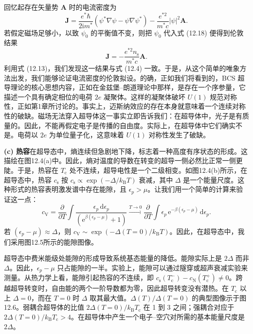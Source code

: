 回忆起存在矢量势 $\mathbf{A}$ 时的电流密度为
\begin{equation*}
\mathbf{J}=\frac{e^{*}\hbar}{2\mathrm{i}m^{*}}\left(\psi^{*}\nabla\psi-\psi\nabla\psi^{*}\right)-\frac{e^{*2}}{m^{*}c}|\psi|^{2}\mathbf{A}.\tag{12.18}
\end{equation*}
若假定磁场足够小，以致 $\psi_{0}$ 的平衡值不变，则把 $\psi_{0}$ 代入式 (12.18) 便得到伦敦结果
\begin{equation*}
\mathbf{J}=-\frac{e^{*2}n_{\mathrm{s}}}{m^{*}c}\mathbf{A}.\tag{12.19}
\end{equation*}
利用式 (12.13)，我们发现这一结果与式 (12.4) 一致。于是，从这个简单的唯象方法出发，我们能够论证电流密度的伦敦拟设。的确，正如我们将看到的，BCS 超导理论的核心思想内容，正如在金兹堡–朗道理论中那样，是存在一个序参量，它描述一个具有确定相位的电荷 $2e$ 凝聚体。这样的凝聚体破坏 $U(1)$ 规范对称性，正如第1章所讨论的。事实上，迈斯纳效应的存在本身就意味着一个连续对称性的破缺。磁场无法穿入超导体这一事实立即告诉我们：在超导体中，光子是有质量的。因此，不能再假定电子是传播的自由度。实际上，在超导体中它们确实不是。电荷以 $2e$ 为单位量子化，这意味着 $U(1)$ 对称性发生了破缺。

\textbf{(c) 热容}\quad 在超导态中，熵连续但急剧地下降，标志着一种高度有序状态的形成。这描绘在图12.4(a)中。因此，熵对温度的导数在转变的超导一侧必然比正常一侧更陡。于是，热容在 $T_{\mathrm{c}}$ 处不连续，超导电性是一个二级相变。如图12.4(b)所示，在超导态中，热容 $c_{\mathrm{s}}$ 按 $c_{\mathrm{s}}\propto\exp(-\Delta/k_{\mathrm{B}}T)$ 衰减，其中 $\Delta$ 是一个能量尺度。这种形式的热容表明激发谱中存在能隙，且 $\epsilon_{p}>\mu$。让我们用一个简单的计算来验证这一点：
\begin{equation*}
c_{\mathrm{V}}=\frac{\partial}{\partial T}\int\frac{\epsilon_{p}\,\mathrm{d}\epsilon_{p}}{\left(\mathrm{e}^{\beta(\epsilon_{p}-\mu)}+1\right)}\overset{T\to 0}{\longrightarrow}\frac{\partial}{\partial T}\int\epsilon_{p}\,\mathrm{e}^{-\beta(\epsilon_{p}-\mu)}\,\mathrm{d}\epsilon_{p}.\tag{12.20}
\end{equation*}
若 $(\epsilon_{p}-\mu)\approx\Delta$，则 $c_{\mathrm{V}}\sim\exp(-\Delta(T=0)/k_{\mathrm{B}}T)$。因此，在超导态中，我们采用图12.5所示的能隙图像。

超导态中费米能级处能隙的形成导致系统基态能量的降低。能隙实际上是 $2\Delta$ 而非 $\Delta$。因此，$\epsilon_{p}-\mu$ 只占能隙的一半。实验上，能隙可以通过隧穿或超声衰减实验来测量。从热力学上看，能隙引起热容的不连续，即 $c_{\mathrm{s}}(T_{\mathrm{c}}^{-})-c_{\mathrm{N}}(T_{\mathrm{c}}^{+})\neq 0$。跨越超导转变时，自由能的两个一阶导数都为零，因此超导转变没有潜热。在 $T_{\mathrm{c}}$ 以上 $\Delta=0$，而在 $T=0$ 时 $\Delta$ 取其最大值。$\Delta(T)/\Delta(T=0)$ 的典型图像示于图12.6。弱耦合超导体的比值 $2\Delta(T=0)/k_{\mathrm{B}}T_{\mathrm{c}}$ 在 1 到 3 之间；强耦合对应于 $2\Delta(T=0)/k_{\mathrm{B}}T_{\mathrm{c}}>4$。在超导体中产生一个电子–空穴对所需的基本能量尺度是 $2\Delta$。

